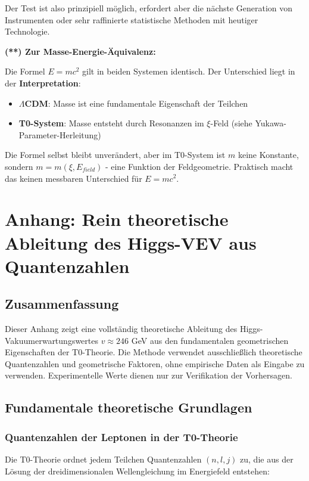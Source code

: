 \documentclass[12pt,a4paper]{article}
\theoremstyle{definition}
\begin{document}
Der Test ist also prinzipiell möglich, erfordert aber die nächste Generation von Instrumenten oder sehr raffinierte statistische Methoden mit heutiger Technologie.

\textbf{(**) Zur Masse-Energie-Äquivalenz:}

Die Formel $E = mc^2$ gilt in beiden Systemen identisch. Der Unterschied liegt in der \textbf{Interpretation}:

\begin{itemize}
	\item \textbf{$\Lambda$CDM}: Masse ist eine fundamentale Eigenschaft der Teilchen
	\item \textbf{T0-System}: Masse entsteht durch Resonanzen im $\xi$-Feld (siehe Yukawa-Parameter-Herleitung)
\end{itemize}

Die Formel selbst bleibt unverändert, aber im T0-System ist $m$ keine Konstante, sondern $m = m(\xi, E_{field})$ - eine Funktion der Feldgeometrie. Praktisch macht das keinen messbaren Unterschied für $E = mc^2$.
\appendix

\section{Anhang: Rein theoretische Ableitung des Higgs-VEV aus Quantenzahlen}

\subsection{Zusammenfassung}

Dieser Anhang zeigt eine vollst{\"a}ndig theoretische Ableitung des Higgs-Vakuumerwartungswertes $v \approx 246$ GeV aus den fundamentalen geometrischen Eigenschaften der T0-Theorie. Die Methode verwendet ausschlie{\ss}lich theoretische Quantenzahlen und geometrische Faktoren, ohne empirische Daten als Eingabe zu verwenden. Experimentelle Werte dienen nur zur Verifikation der Vorhersagen.

\subsection{Fundamentale theoretische Grundlagen}

\subsubsection{Quantenzahlen der Leptonen in der T0-Theorie}

Die T0-Theorie ordnet jedem Teilchen Quantenzahlen $(n, l, j)$ zu, die aus der L{\"o}sung der dreidimensionalen Wellengleichung im Energiefeld entstehen:
\end{document}
